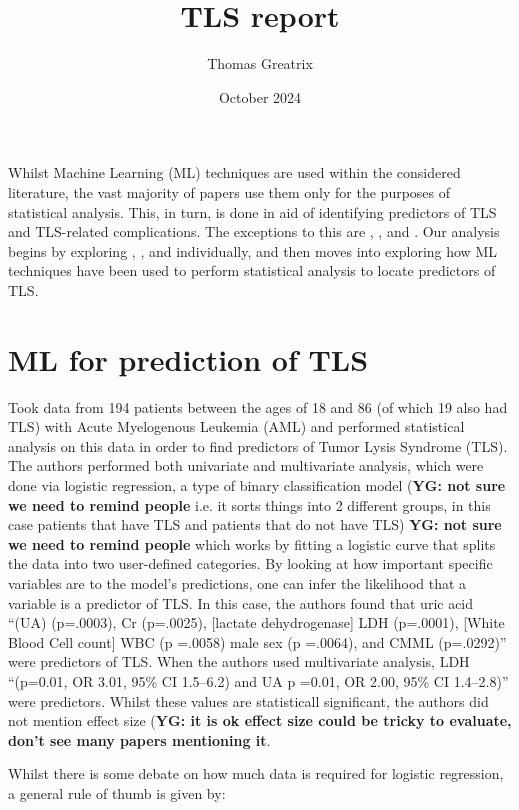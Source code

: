 \documentclass{article}
\title{TLS report}
\author{Thomas Greatrix}
\date{October 2024}
\begin{document}
\maketitle

Whilst Machine Learning (ML) techniques are used within the considered literature, the vast majority of papers use them only for the purposes of statistical analysis. This, in turn, is done in aid of identifying predictors of TLS and TLS-related complications. The exceptions to this are \cite{mato2004predictive}, 
\cite{montesinos2008tumor}, and  \cite{xiao2024prediction}. Our analysis begins by exploring \cite{mato2004predictive}, 
\cite{montesinos2008tumor}, and  \cite{xiao2024prediction} individually, and then moves into exploring how ML techniques have been used to perform statistical analysis to locate predictors of TLS.

\section{ML for prediction of TLS}

\cite{mato2004predictive} Took data from 194 patients between the ages of 18 and 86 (of which 19 also had TLS) with Acute Myelogenous Leukemia (AML) and performed statistical analysis on this data in order to find predictors of Tumor Lysis Syndrome (TLS). The authors performed both univariate and multivariate analysis, which were done via logistic regression, a type of binary classification model (\textbf{YG: not sure we need to remind people} i.e. it sorts things into 2 different groups, in this case patients that have TLS and patients that do not have TLS) \textbf{YG: not sure we need to remind people} which works by fitting a logistic curve that splits the data into two user-defined categories. By looking at how important specific variables are to the model’s predictions, one can infer the likelihood that a variable is a predictor of TLS. In this case, the authors found that uric acid “(UA) (p=.0003), Cr (p=.0025), [lactate dehydrogenase] LDH (p=.0001), [White Blood Cell count] WBC (p =.0058) male sex (p =.0064), and CMML (p=.0292)” were predictors of TLS. When the authors used multivariate analysis, LDH “(p=0.01, OR 3.01, 95\% CI 1.5–6.2) and UA p =0.01, OR 2.00, 95\% CI 1.4–2.8)” were predictors. Whilst these values are statisticall significant, the authors did not mention effect size (\textbf{YG: it is ok effect size could be tricky to evaluate, don't see many papers mentioning it}.

Whilst there is some debate on how much data is required for logistic regression, a general rule of thumb is given by:
\end{document}
